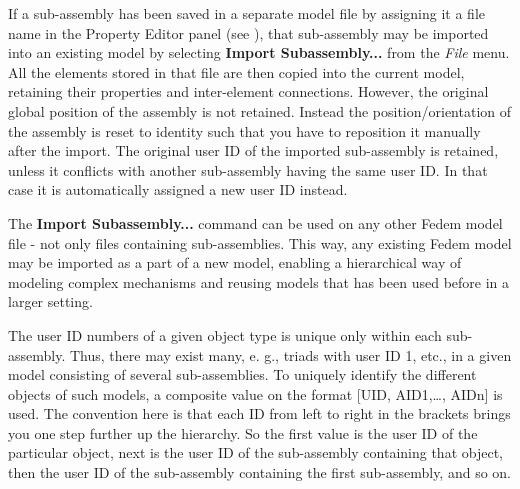 
If a sub-assembly has been saved in a separate model file by assigning
it a file name in the Property Editor panel (see
), that
sub-assembly may be imported into an existing model by selecting
\textbf{Import Subassembly...} from the {\sl File} menu. All the
elements stored in that file are then copied into the current model,
retaining their properties and inter-element connections. However, the
original global position of the assembly is not retained. Instead the
position/orientation of the assembly is reset to identity such that you
have to reposition it manually after the import. The original user ID of
the imported sub-assembly is retained, unless it conflicts with another
sub-assembly having the same user ID.
In that case it is automatically assigned a new user ID instead.


The \textbf{Import Subassembly...} command can be used on any other
Fedem model file - not only files containing sub-assemblies. This way,
any existing Fedem model may be imported as a part of a new model,
enabling a hierarchical way of modeling complex mechanisms and reusing
models that has been used before in a larger setting.




The user ID numbers of a given object type is unique only within each
sub-assembly. Thus, there may exist many, e. g., triads with user ID 1,
etc., in a given model consisting of several sub-assemblies. To uniquely
identify the different objects of such models, a composite value on the
format {[}UID, AID1,\ldots, AIDn{]} is used. The convention here is that
each ID from left to right in the brackets brings you one step further
up the hierarchy. So the first value is the user ID of the particular
object, next is the user ID of the sub-assembly containing that object,
then the user ID of the sub-assembly containing the first sub-assembly,
and so on.

